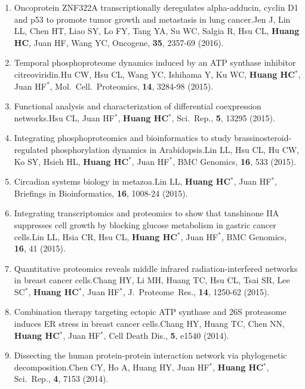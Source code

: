 \documentclass[10pt,a4paper]{article}
\def\mypub#1#2#3{{#1.}\newline #2, #3.}
\def\cited#1{Cited $\ge$ #1}
\begin{document}
\begin{enumerate}
\item
\mypub{Oncoprotein ZNF322A transcriptionally deregulates alpha-adducin, cyclin D1 and p53 to promote tumor growth and metastasis in lung cancer}
{Jen J, Lin LL, Chen HT, Liao SY, Lo FY, Tang YA, Su WC, Salgia R, Hsu CL, {\bf Huang HC},  Juan HF, Wang YC}
{Oncogene, {\bf 35}, 2357-69 (2016)}

\item
\mypub{Temporal phosphoproteome dynamics induced by an ATP
synthase inhibitor citreoviridin}
{Hu CW, Hsu CL, Wang YC, Ishihama Y, Ku WC, {\bf Huang HC$^*$}, Juan HF$^*$}
{Mol.\ Cell.\ Proteomics, {\bf 14}, 3284-98 (2015)}

\item
\mypub{Functional analysis and characterization of differential coexpression networks}
{Hsu CL, Juan HF$^*$, {\bf Huang HC$^*$}}
{Sci.\ Rep., {\bf 5}, 13295 (2015)}

\item
\mypub{Integrating phosphoproteomics and bioinformatics to study brassinosteroid-regulated phosphorylation dynamics in Arabidopsis}
{Lin LL, Hsu CL, Hu CW, Ko SY, Hsieh HL, {\bf Huang HC$^*$}, Juan HF$^*$}
{BMC Genomics, {\bf 16}, 533 (2015)}

\item
\mypub{Circadian systems biology in metazoa}
{Lin LL, {\bf Huang HC$^*$}, Juan HF$^*$}
{Briefings in Bioinformatics, {\bf 16}, 1008-24 (2015)}

\item
\mypub{Integrating transcriptomics and proteomics to show that tanshinone IIA suppresses cell growth by blocking glucose metabolism in gastric cancer cells}
{Lin LL, Hsia CR, Hsu CL, {\bf Huang HC$^*$}, Juan HF$^*$}
{BMC Genomics, {\bf 16}, 41 (2015)}

\item
\mypub{Quantitative proteomics reveals middle infrared radiation-interfered networks in breast cancer cells}
{Chang HY, Li MH, Huang TC, Hsu CL, Tsai SR, Lee SC$^*$, {\bf Huang HC$^*$}, Juan HF$^*$}
{J.\ Proteome\ Res., {\bf 14}, 1250-62 (2015)}

\item
\mypub{Combination therapy targeting ectopic ATP synthase and 26S proteasome induces ER stress in breast cancer cells}
{Chang HY, Huang TC, Chen NN, {\bf Huang HC$^*$}, Juan HF$^*$}
{Cell Death Dis., {\bf 5}, e1540 (2014)}

\item
\mypub{Dissecting the human protein-protein interaction network via phylogenetic decomposition}
{Chen CY, Ho A, Huang HY, Juan HF$^*$, {\bf Huang HC$^*$}}
{Sci.\ Rep., {\bf 4}, 7153 (2014)}


\end{enumerate}
\end{document}
